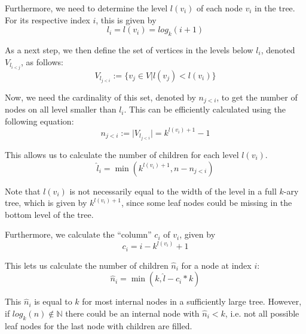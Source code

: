 Furthermore, we need to determine the level $l(v_i)$ of each node $v_i$ in the tree. For its respective index $i$, this is given by
\begin{equation}
    l_i = l(v_i) = log_k(i+1)
\end{equation}

As a next step, we then define the set of vertices in the levels below $l_i$, denoted $V_{l_{i<j}}$, as follows:
\begin{equation}
    V_{l_{j<i}} := \{v_j \in V \vert l(v_j) < l(v_i) \}
\end{equation}

Now, we need the cardinality of this set, denoted by $n_{j<i}$, to get the number of nodes on all level smaller than $l_i$. This can be efficiently calculated using the following equation:
\begin{equation}
     n_{j<i} := \vert V_{l_{j<i}}\vert = k^{l(v_i) + 1} - 1
\end{equation}

This allows us to calculate the number of children for each level $l(v_i)$.
\begin{equation}
    \hat{l}_i = \min(k^{l(v_i) + 1}, n - n_{j<i})
\end{equation}

\begin{note}
Note that $l(v_i)$ is not necessarily equal to the width of the level in a full $k$-ary tree, which is given by $k^{l(v_i) + 1}$, since some leaf nodes could be missing in the bottom level of the tree.
\end{note}

Furthermore, we calculate the ``column'' $c_i$ of $v_i$, given by
\begin{equation}
    c_i = i - k^{l(v_i)} + 1
\end{equation}

This lets us calculate the number of children $\hat{n}_i$ for a node at index $i$:
\begin{equation}
    \hat{n}_i = \min(k, \hat{l} - c_i * k)
\end{equation}

\begin{note}
    This $\hat{n}_i$ is equal to $k$ for most internal nodes in a sufficiently large tree. However, if $log_k(n) \notin \mathbb{N}$ there could be an internal node with $\hat{n}_i < k$, i.e. not all possible leaf nodes for the last node with children are filled.
\end{note}


